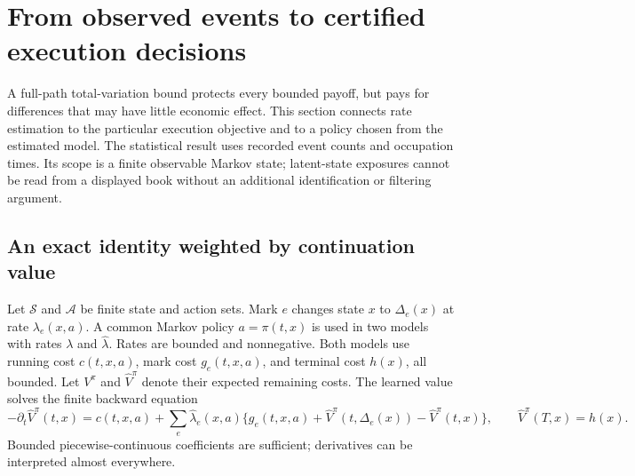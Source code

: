\section{From observed events to certified execution decisions}\label{sec:certified-control}
A full-path total-variation bound protects every bounded payoff, but pays for differences that may have little economic effect. This section connects rate estimation to the particular execution objective and to a policy chosen from the estimated model. The statistical result uses recorded event counts and occupation times. Its scope is a finite observable Markov state; latent-state exposures cannot be read from a displayed book without an additional identification or filtering argument.

\subsection{An exact identity weighted by continuation value}
Let $\mathcal S$ and $\mathcal A$ be finite state and action sets. Mark $e$ changes state $x$ to $\Delta_e(x)$ at rate $\lambda_e(x,a)$. A common Markov policy $a=\pi(t,x)$ is used in two models with rates $\lambda$ and $\widehat\lambda$. Rates are bounded and nonnegative. Both models use running cost $c(t,x,a)$, mark cost $g_e(t,x,a)$, and terminal cost $h(x)$, all bounded. Let $V^\pi$ and $\widehat V^\pi$ denote their expected remaining costs. The learned value solves the finite backward equation
\begin{equation}\label{eq:backward-value}
 -\partial_t\widehat V^\pi(t,x)
 =c(t,x,a)+\sum_e\widehat\lambda_e(x,a)
 \{g_e(t,x,a)+\widehat V^\pi(t,\Delta_e(x))-\widehat V^\pi(t,x)\},
 \qquad \widehat V^\pi(T,x)=h(x).
\end{equation}
Bounded piecewise-continuous coefficients are sufficient; derivatives can be interpreted almost everywhere.


